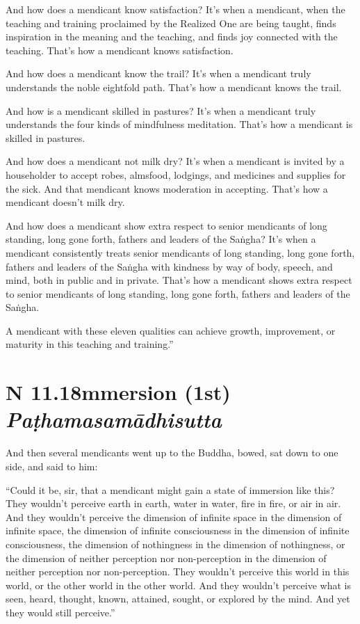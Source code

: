 \documentclass[12pt,openany]{book}%
\newcommand*{\suttatitleacronym}[1]{\smaller[2]{#1}\vspace*{.3em}}
\newcommand*{\suttatitletranslation}[1]{\linebreak{#1}}
\newcommand*{\suttatitleroot}[1]{\linebreak\smaller[2]\itshape{#1}}
\newcommand*{\tocacronym}[1]{\hspace*{-3.3em}{#1}\quad}
\newcommand*{\toctranslation}[1]{#1}
\newcommand*{\tocroot}[1]{(\textit{#1})}
\begin{document}
And how does a mendicant know satisfaction? It’s when a mendicant, when the teaching and training proclaimed by the Realized One are being taught, finds inspiration in the meaning and the teaching, and finds joy connected with the teaching. That’s how a mendicant knows satisfaction. 

And how does a mendicant know the trail? It’s when a mendicant truly understands the noble eightfold path. That’s how a mendicant knows the trail. 

And how is a mendicant skilled in pastures? It’s when a mendicant truly understands the four kinds of mindfulness meditation. That’s how a mendicant is skilled in pastures. 

And how does a mendicant not milk dry? It’s when a mendicant is invited by a householder to accept robes, almsfood, lodgings, and medicines and supplies for the sick. And that mendicant knows moderation in accepting. That’s how a mendicant doesn’t milk dry. 

And how does a mendicant show extra respect to senior mendicants of long standing, long gone forth, fathers and leaders of the \textsanskrit{Saṅgha}? It’s when a mendicant consistently treats senior mendicants of long standing, long gone forth, fathers and leaders of the \textsanskrit{Saṅgha} with kindness by way of body, speech, and mind, both in public and in private. That’s how a mendicant shows extra respect to senior mendicants of long standing, long gone forth, fathers and leaders of the \textsanskrit{Saṅgha}. 

A mendicant with these eleven qualities can achieve growth, improvement, or maturity in this teaching and training.” 

%
\section*{{\suttatitleacronym AN 11.18}{\suttatitletranslation Immersion (1st) }{\suttatitleroot Paṭhamasamādhisutta}}
\addcontentsline{toc}{section}{\tocacronym{AN 11.18} \toctranslation{Immersion (1st) } \tocroot{Paṭhamasamādhisutta}}

And then several mendicants went up to the Buddha, bowed, sat down to one side, and said to him: 

“Could it be, sir, that a mendicant might gain a state of immersion like this? They wouldn’t perceive earth in earth, water in water, fire in fire, or air in air. And they wouldn’t perceive the dimension of infinite space in the dimension of infinite space, the dimension of infinite consciousness in the dimension of infinite consciousness, the dimension of nothingness in the dimension of nothingness, or the dimension of neither perception nor non-perception in the dimension of neither perception nor non-perception. They wouldn’t perceive this world in this world, or the other world in the other world. And they wouldn’t perceive what is seen, heard, thought, known, attained, sought, or explored by the mind. And yet they would still perceive.” 
\end{document}
